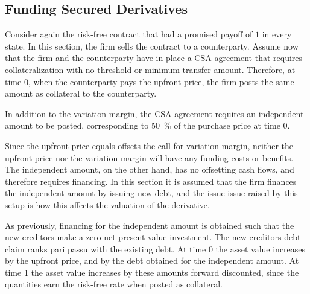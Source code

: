 \documentclass[../main.tex]{subfiles}
\begin{document}
    \subsection{Funding Secured Derivatives}
    \label{sec:example-secured-derivative}
        Consider again the risk-free contract that had a promised payoff of $1$ in every state.
        In this section, the firm sells the contract to a counterparty.
        Assume now that the firm and the counterparty have in place a CSA agreement
        that requires collateralization with no threshold or minimum transfer amount.
        Therefore, at time 0, when the counterparty pays the upfront price,
        the firm posts the same amount as collateral to the counterparty.

        In addition to the variation margin, 
        the CSA agreement requires an independent amount to be posted,
        corresponding to \qty[round-precision=0]{50}{\percent} of the purchase price at time 0.

        Since the upfront price equals offsets the call for variation margin,
        neither the upfront price nor the variation margin will have any funding costs or benefits.
        The independent amount, on the other hand, has no offsetting cash flows, 
        and therefore requires financing.
        In this section it is assumed that the firm finances the independent amount by issuing new debt,
        and the issue issue raised by this setup is how this affects the valuation of the derivative.
        

        As previously, financing for the independent amount is obtained 
        such that the new creditors make a zero net present value investment.
        The new creditors debt claim ranks pari passu with the existing debt.
        At time 0 the asset value increases by the upfront price,
        and by the debt obtained for the independent amount.
        At time 1 the asset value increases by these amounts forward discounted,
        since the quantities earn the risk-free rate when posted as collateral.
\end{document}
